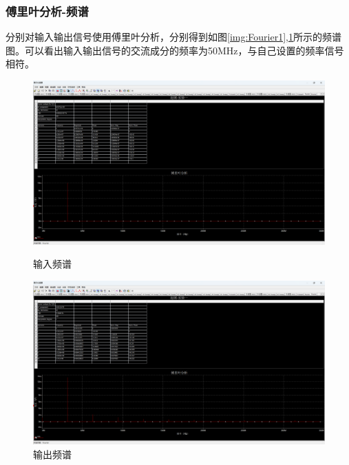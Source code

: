 \documentclass[UTF8]{ctexart}
\begin{document}
\subsubsection{傅里叶分析-频谱}
分别对输入输出信号使用傅里叶分析，分别得到如图\ref{img:Fourier1},\ref{img:Fourier2}所示的频谱图。可以看出输入输出信号的交流成分的频率为50MHz，与自己设置的频率信号相符。
\begin{figure}[htbp]
    \centering
    \begin{minipage}[t]{0.49\textwidth}
        \centering
        \includegraphics[width=0.7\linewidth]{Fourier_v1.png}
        \caption{输入频谱}
        \label{img:Fourier1}
    \end{minipage}
    \begin{minipage}[t]{0.49\textwidth}
        \centering
        \includegraphics[width=0.7\linewidth]{Fourier_v5.png}
        \caption{输出频谱}
        \label{img:Fourier2}
    \end{minipage}
\end{figure}
\end{document}
